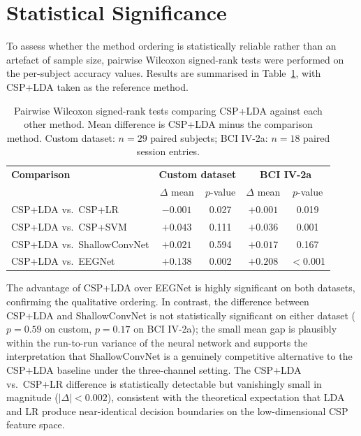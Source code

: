 \documentclass[english, bc, kiv, he, iso690alph, pdf]{fasthesis}
\begin{document}
\section{Statistical Significance}

To assess whether the method ordering is statistically reliable rather than an artefact of sample size, pairwise Wilcoxon signed-rank tests were performed on the per-subject accuracy values. Results are summarised in Table~\ref{tab:wilcoxon}, with CSP+LDA taken as the reference method.

\begin{table}[ht]
    \centering
    \caption{Pairwise Wilcoxon signed-rank tests comparing CSP+LDA against each other method. Mean difference is CSP+LDA minus the comparison method. Custom dataset: $n = 29$ paired subjects; BCI IV-2a: $n = 18$ paired session entries.}
    \label{tab:wilcoxon}
    \begin{tabular}{lcccc}
        \hline
        \textbf{Comparison} & \multicolumn{2}{c}{\textbf{Custom dataset}} & \multicolumn{2}{c}{\textbf{BCI IV-2a}} \\
                            & $\Delta$ mean & $p$-value & $\Delta$ mean & $p$-value \\
        \hline
        CSP+LDA vs.\ CSP+LR         & $-0.001$ & 0.027 & $+0.001$ & 0.019 \\
        CSP+LDA vs.\ CSP+SVM        & $+0.043$ & 0.111 & $+0.036$ & 0.001 \\
        CSP+LDA vs.\ ShallowConvNet & $+0.021$ & 0.594 & $+0.017$ & 0.167 \\
        CSP+LDA vs.\ EEGNet         & $+0.138$ & 0.002 & $+0.208$ & $<$0.001 \\
        \hline
    \end{tabular}
\end{table}

The advantage of CSP+LDA over EEGNet is highly significant on both datasets, confirming the qualitative ordering. In contrast, the difference between CSP+LDA and ShallowConvNet is not statistically significant on either dataset ($p = 0.59$ on custom, $p = 0.17$ on BCI IV-2a); the small mean gap is plausibly within the run-to-run variance of the neural network and supports the interpretation that ShallowConvNet is a genuinely competitive alternative to the CSP+LDA baseline under the three-channel setting. The CSP+LDA vs.\ CSP+LR difference is statistically detectable but vanishingly small in magnitude ($|\Delta|<\!0.002$), consistent with the theoretical expectation that LDA and LR produce near-identical decision boundaries on the low-dimensional CSP feature space.
\end{document}
